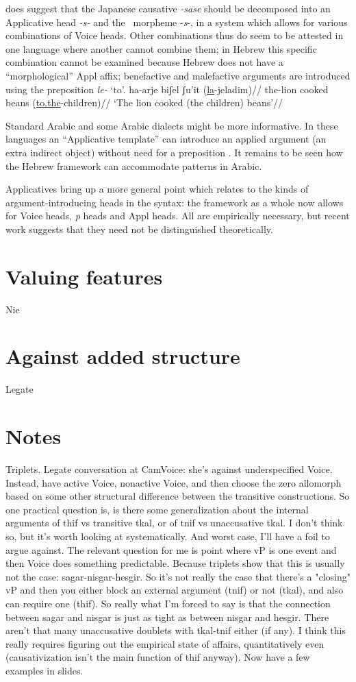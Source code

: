 \cite{oseki16nyu} does suggest that the Japanese causative \emph{-sase} should be decomposed into an Applicative head \emph{-s-} and the \vd~morpheme -\emph{s}-{, in a system which allows for various combinations of Voice heads}. Other combinations thus do seem to be attested in one language where another cannot combine them; in Hebrew this {specific }combination cannot be examined because Hebrew does not have a ``morphological'' Appl affix; benefactive and malefactive arguments are introduced using the preposition \emph{le-} `to'.
\ex \begingl
    \gla ha-arje biʃel ʃu'it (\underline{la}-jeladim)//
    \glb the-lion cooked beans (\underline{to.the}-children)//
    \glft `The lion cooked (the children) beans'//
    \endgl
\xe

Standard Arabic and some Arabic dialects might be more informative. In these languages an ``Applicative template'' can introduce an applied argument (an extra indirect object) without need for a preposition \citep{alkaabi12}. It remains to be seen how the Hebrew framework can accommodate patterns in Arabic.

Applicatives bring up a more general point which relates to the kinds of argument-introducing heads in the syntax: the framework as a whole now allows for Voice heads, \emph{p} heads and Appl heads. All are empirically necessary, but recent work suggests that they need not be distinguished theoretically.

\section{Valuing features}
Nie

\section{Against added structure}
Legate


\section{Notes}
Triplets.
Legate conversation at CamVoice: she's against underspecified Voice. Instead, have active Voice, nonactive Voice, and then choose the zero allomorph based on some other structural difference between the transitive constructions. So one practical question is, is there some generalization about the internal arguments of thif vs transitive tkal, or of tnif vs unaccusative tkal.
	I don't think so, but it's worth looking at systematically. And worst case, I'll have a foil to argue against.
	The relevant question for me is point where vP is one event and then Voice does something predictable. Because triplets show that this is usually not the case: sagar-nisgar-hesgir. So it's not really the case that there's a "closing" vP and then you either block an external argument (tnif) or not (tkal), and also can require one (thif).
	So really what I'm forced to say is that the connection between sagar and nisgar is just as tight as between nisgar and hesgir.
	There aren't that many unaccusative doublets with tkal-tnif either (if any).
	I think this really requires figuring out the empirical state of affairs, quantitatively even (causativization isn't the main function of thif anyway).
	Now have a few examples in slides.
